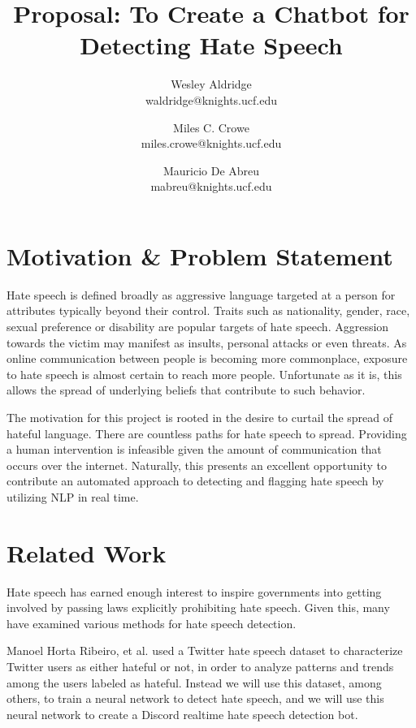 \documentclass[conference]{sig-alternate-05-2015}
\begin{document}
\title{Proposal: To Create a Chatbot for Detecting Hate Speech}

\author{Wesley Aldridge\\ waldridge@knights.ucf.edu \and Miles C. Crowe  \\ miles.crowe@knights.ucf.edu \and Mauricio De Abreu\\ mabreu@knights.ucf.edu}

\maketitle

\section{Motivation \& Problem Statement}\label{sec:motivation}
Hate speech is defined broadly as aggressive language targeted at a person for attributes typically beyond their control.  Traits such as nationality, gender, race, sexual preference or disability are popular targets of hate speech\cite{Dictionary.com}.  Aggression towards the victim may manifest as insults, personal attacks or even threats.  As online communication between people is becoming more commonplace, exposure to hate speech is almost certain to reach more people.  Unfortunate as it is, this allows the spread of underlying beliefs that contribute to such behavior.

The motivation for this project is rooted in the desire to curtail the spread of hateful language.  There are countless paths for hate speech to spread.  Providing a human intervention is infeasible given the amount of communication  that occurs over the internet.  Naturally, this presents an excellent opportunity to contribute an automated approach to detecting and flagging hate speech by utilizing NLP in real time.

\section{Related Work}\label{sec:related}

Hate speech has earned enough interest to inspire governments into getting involved\cite{Davidsonetal.} by passing laws explicitly prohibiting hate speech.  Given this, many have examined various methods for hate speech detection.

Manoel Horta Ribeiro, et al.\cite{HatefulUsersTwitter}\cite{ribeiro2017like} used a Twitter hate speech dataset to characterize Twitter users as either hateful or not, in order to analyze patterns and trends among the users labeled as hateful. Instead we will use this dataset, among others, to train a neural network to detect hate speech, and we will use this neural network to create a Discord realtime hate speech detection bot.
\end{document}
